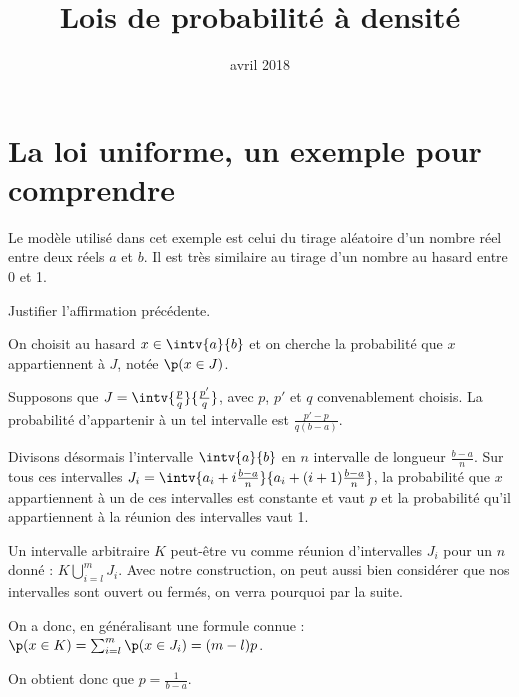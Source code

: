 \documentclass[11pt,a4paper,french]{article}
\title{Lois de probabilité à densité}
\author{\bsc{Jumel}}
\date{avril 2018}
\begin{document}
\maketitle

\bigskip

\section{La loi uniforme, un exemple pour comprendre}

Le modèle utilisé dans cet exemple est celui du tirage aléatoire d'un
nombre réel entre deux réels $a$ et $b$. Il est très similaire au tirage
d'un nombre au hasard entre 0 et 1.

\begin{question}
  Justifier l'affirmation précédente.
\end{question}


On choisit au hasard $x \in \intv{a}{b}$ et on cherche la probabilité
que $x$ appartiennent à $J$, notée $\p(x\in J)$.

Supposons que $J = \intv{\frac{p}q}{\frac{p'}q}$, avec $p$, $p'$ et
$q$ convenablement choisis. La probabilité d'appartenir à un tel
intervalle est $\frac{p' - p}{q(b-a)}$.

Divisons désormais l'intervalle $\intv{a}{b}$ en $n$ intervalle de
longueur $\frac{b-a}n$. Sur tous ces intervalles $J_i = \intv{a_i +
i\frac{b-a}n}{a_i + (i+1)\frac{b-a}n}$, la probabilité que $x$
appartiennent à un de ces intervalles est constante et vaut $p$ et
la probabilité qu'il appartiennent à la réunion des intervalles vaut 1.

Un intervalle arbitraire $K$ peut-être vu comme réunion d'intervalles
$J_i$ pour un $n$ donné : $K \bigcup_{i = l}^m J_i$. Avec notre
construction, on peut aussi bien considérer que nos intervalles sont
ouvert ou fermés, on verra pourquoi par la suite.

On a donc, en généralisant une formule connue : $\p(x\in K) =
\sum_{i=l}^m \p(x\in J_i) = (m -l)p$.

On obtient donc que $p = \frac1{b-a}$.
\end{document}
